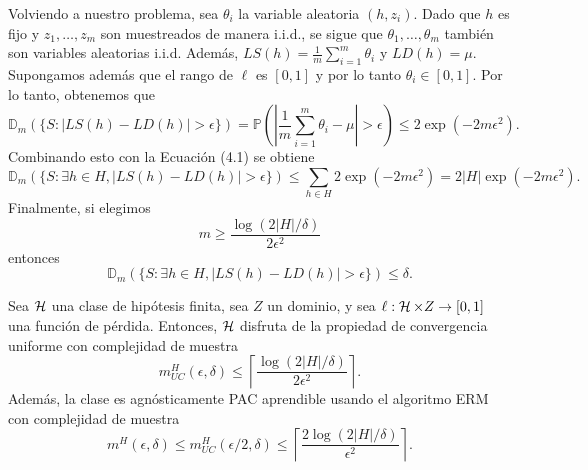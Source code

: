 Volviendo a nuestro problema, sea $ \theta_i $ la variable aleatoria $(h, z_i)$. Dado que $ h $ es fijo y $ z_1, \ldots, z_m $ son muestreados de manera i.i.d., se sigue que $ \theta_1, \ldots, \theta_m $ también son variables aleatorias i.i.d. Además, $LS(h) = \frac{1}{m} \sum_{i=1}^{m} \theta_i$ y $LD(h) = \mu$. Supongamos además que el rango de $\ell$ es $[0, 1]$ y por lo tanto $\theta_i \in [0, 1]$. Por lo tanto, obtenemos que
\begin{equation}
\mathbb{D}_m(\{S : |LS(h) - LD(h)| > \epsilon\}) = \mathbb{P}\left(\left|\frac{1}{m} \sum_{i=1}^{m} \theta_i - \mu\right| > \epsilon\right) \leq 2 \exp\left(-2 m \epsilon^2\right).
\end{equation}
Combinando esto con la Ecuación (4.1) se obtiene
$$
\mathbb{D}_m(\{S : \exists h \in H, |LS(h) - LD(h)| > \epsilon\}) \leq \sum_{h \in H} 2 \exp\left(-2 m \epsilon^2\right) = 2 |H| \exp\left(-2 m \epsilon^2\right).
$$
Finalmente, si elegimos
$$
m \geq \frac{\log(2|H|/\delta)}{2\epsilon^2}
$$
entonces
$$
\mathbb{D}_m(\{S : \exists h \in H, |LS(h) - LD(h)| > \epsilon\}) \leq \delta.
$$

\begin{cor}
Sea $ \mathop{\mbox{$\mathcal{H}$}}\nolimits $ una clase de hipótesis finita, sea $Z$ un dominio, y sea $\ell: \mathop{\mbox{$\mathcal{H}$}}\nolimits \times Z \rightarrow [0, 1] $ una función de pérdida. Entonces, $ \mathop{\mbox{$\mathcal{H}$}}\nolimits $ disfruta de la propiedad de convergencia uniforme con complejidad de muestra
$$
m_{UC}^H (\epsilon, \delta) \leq \left\lceil \frac{\log(2|H|/\delta)}{2\epsilon^2} \right\rceil.
$$
Además, la clase es agnósticamente PAC aprendible usando el algoritmo ERM con complejidad de muestra
$$
m^H(\epsilon, \delta) \leq m_{UC}^H (\epsilon/2, \delta) \leq \left\lceil \frac{2 \log(2|H|/\delta)}{\epsilon^2} \right\rceil.
$$
\end{cor}

